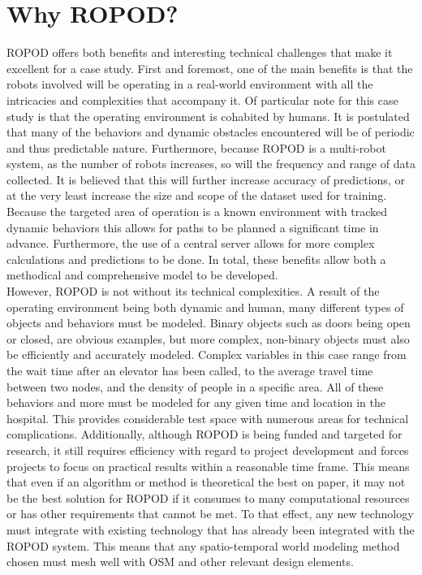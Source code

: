   \section{ Why ROPOD? }
  ROPOD offers both benefits and interesting technical
  challenges that make it excellent for a case study. First and
  foremost, one of the main benefits is that the robots involved will be
  operating in a real-world environment with all the intricacies and
  complexities that accompany it. Of particular note for this case study is
  that the operating environment is cohabited by humans. It is
  postulated that many of the behaviors and dynamic obstacles encountered
  will be of periodic and thus predictable nature. Furthermore, because ROPOD
  is a multi-robot system, as the number of robots increases, so will the
  frequency and range of data collected. It is believed that this
  will further increase accuracy of predictions, or at the very least increase
  the size and scope of the dataset used for training. Because the targeted
  area of operation is a known environment with tracked dynamic behaviors this allows for paths to be
  planned a significant time in advance. Furthermore, the use of a central
  server allows for more complex calculations and predictions to be done.
  In total, these benefits allow both a methodical and comprehensive model
  to be developed. \\

  However, ROPOD is not without its technical complexities. A
  result of the operating environment being both dynamic and human, many
  different types of objects and behaviors must be modeled. Binary objects
  such as doors being open or closed, are obvious examples, but more
  complex, non-binary objects must also be efficiently and accurately modeled.
  Complex variables in this case range from the wait time after an elevator has been called,
  to the average travel time between two nodes, and the
  density of people in a specific area. All of these behaviors and more must be
  modeled for any given time and location in the hospital. This provides considerable
  test space with numerous areas for technical complications. Additionally,
  although ROPOD is being funded and targeted for research, it still requires
  efficiency with regard to project development and forces projects to focus on practical results within
  a reasonable time frame. This means that even if an algorithm or method
  is theoretical the best on paper, it may not be the best solution for ROPOD
  if it consumes to many computational resources or has other requirements that
  cannot be met. To that effect, any new technology must integrate
  with existing technology that has already been integrated with the ROPOD system. This
  means that any spatio-temporal world modeling method chosen must mesh well with OSM and other relevant design
  elements. \\



